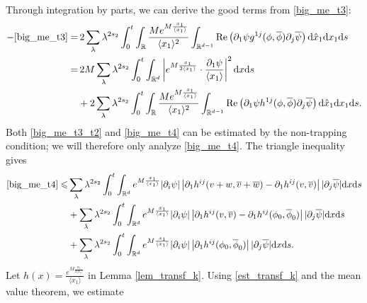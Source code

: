 \documentclass[10pt,twoside,a4paper]{article}
\numberwithin{equation}{section}\allowdisplaybreaks
\def\leq{\leqslant}
\begin{document}
Through integration by parts, we can derive the good terms from  \eqref{big_me_t3}:
\begin{align}
	-  \eqref{big_me_t3}	 =&\,  2 \sum_{\lambda} \lambda^{ 2s_2}\int_0^t\int_{\mathbb{R}}    \frac{ M	e^{M \frac{x_1}{\langle x_1\rangle} } }{\langle x_1\rangle^2}   \int_{\mathbb{R}^{d-1}} \mathrm{Re}\left(\partial_1 \psi g^{1j} (\phi,\overline{\phi})\partial_j \overline{\psi}\right) \mathrm{d} \hat{x}_1  \mathrm{d} x_1 \mathrm{d} s\nonumber \\
	=&  \,2 M\sum_{\lambda} \lambda^{ 2s_2}\int_0^t    \int_{\mathbb{R}^{d}} \left|	e^{M \frac{x_1}{2\langle x_1\rangle} }\cdot \frac{\partial_1 \psi }{\langle x_1\rangle}\right|^2   \mathrm{d} x  \mathrm{d} s  \label{big_me_t3_t1}\\
	&+2 \sum_{\lambda} \lambda^{ 2s_2}\int_0^t\int_{\mathbb{R}}    \frac{ M	e^{M \frac{x_1}{\langle x_1\rangle} } }{\langle x_1\rangle^2}    \int_{\mathbb{R}^{d-1}} \mathrm{Re}\left(\partial_1 \psi h^{1j} (\phi,\overline{\phi})\partial_j \overline{\psi}\right) \mathrm{d} \hat{x}_1  \mathrm{d} x_1 \mathrm{d} s.  \label{big_me_t3_t2}
\end{align}
Both \eqref{big_me_t3_t2} and \eqref{big_me_t4} can be estimated by the non-trapping condition;  we will therefore only analyze \eqref{big_me_t4}.
The triangle inequality gives 
\begin{align}
	\eqref{big_me_t4} \leq & \sum_{\lambda} \lambda^{ 2s_2} \int_0^t\int_{\mathbb{R}^d}  e^{M \frac{x_1}{\langle x_1\rangle} }   |\partial_i \psi| \left|\partial_1 h^{ij} (v+w,\overline{v}+\overline{w})-\partial_1  h^{ij} (v,\overline{v})\right| |\partial_j\overline{\psi } |  \mathrm{d} x  \mathrm{d} s \label{big_me_t4_1}\\
	&+\sum_{\lambda} \lambda^{ 2s_2}\int_0^t\int_{\mathbb{R}^d}     e^{M \frac{x_1}{\langle x_1\rangle} }  |\partial_i \psi| \left|\partial_1 h^{ij} (v ,\overline{v} )-\partial_1 h^{ij} (\phi_0,\overline{\phi}_0)\right| |\partial_j\overline{\psi}|  \mathrm{d} x  \mathrm{d} s  \label{big_me_t4_2}\\
	&+\sum_{\lambda} \lambda^{ 2s_2} \int_0^t\int_{\mathbb{R}^d}   e^{M \frac{x_1}{\langle x_1\rangle} }  |\partial_i \psi| \left| \partial_1 h^{ij} (\phi_0,\overline{\phi}_0)\right| |\partial_j\overline{\psi}|  \mathrm{d} x  \mathrm{d} s.  \label{big_me_t4_3}
\end{align}
Let $h(x) = \frac{ e^{M \frac{x_1}{2\langle x_1\rangle} } }{\langle x_1\rangle}$ in Lemma \ref{lem_transf_k}. Using \eqref{est_transf_k} and the mean value theorem, we estimate
\end{document}
